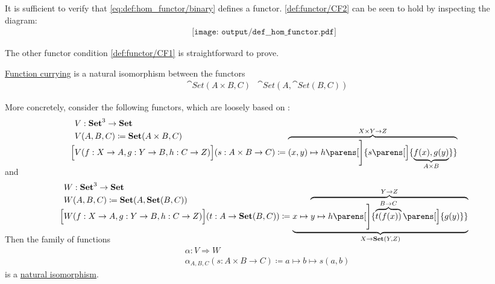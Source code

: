 \begin{defproof}
  It is sufficient to verify that \eqref{eq:def:hom_functor/binary} defines a functor. \ref{def:functor/CF2} can be seen to hold by inspecting the diagram:
  \begin{equation}\label{eq:def:hom_functor/inv_composition}
    \begin{aligned}
      \texttt{[image: output/def\_\_hom\_functor.pdf]}
    \end{aligned}
  \end{equation}

  The other functor condition \ref{def:functor/CF1} is straightforward to prove.
\end{defproof}

\begin{proposition}\label{thm:currying_is_natural_isomorphism}
  \hyperref[def:function/currying]{Function currying} is a natural isomorphism between the functors
  \begin{align*}
    &\cat{Set}(A \times B, C)
    &\cat{Set}(A, \cat{Set}(B, C))
  \end{align*}

  More concretely, consider the following functors, which are loosely based on :
  \begin{equation*}
    \begin{aligned}
      &V: \cat{Set}^3 \to \cat{Set} \\
      &V(A, B, C) \coloneqq \cat{Set}(A \times B, C) \\
      \Big[& V(f: X \to A, g: Y \to B, h: C \to Z) \Big](s: A \times B \to C) \coloneqq \smash{ \overbrace{ (x, y) \mapsto h\parens[\Bigg]{ s\parens[\Big]{ \underbrace{ f(x), g(y) }_{A \times B} } } }^{X \times Y \to Z} } \\
    \end{aligned}
  \end{equation*}
  and
  \begin{equation*}
    \begin{aligned}
      &W: \cat{Set}^3 \to \cat{Set} \\
      &W(A, B, C) \coloneqq \cat{Set}(A, \cat{Set}(B, C)) \\
      \Big[& W(f: X \to A, g: Y \to B, h: C \to Z) \Big](t: A \to \cat{Set}(B, C)) \coloneqq \smash{ \underbrace{ x \mapsto \overbrace{y \mapsto h\parens[\Bigg]{ \overbrace{t(f(x))}^{B \to C}\parens[\Big]{ g(y) } } }^{Y \to Z} }_{X \to \cat{Set}(Y, Z)} } \\
    \end{aligned}
  \end{equation*}

  Then the family of functions
  \begin{equation*}
    \begin{aligned}
      &\alpha: V \Rightarrow W \\
      &\alpha_{A,B,C}(s: A \times B \to C) \coloneqq a \mapsto b \mapsto s(a, b)
    \end{aligned}
  \end{equation*}
  is a \hyperref[thm:natural_isomorphism]{natural isomorphism}.
\end{proposition}
